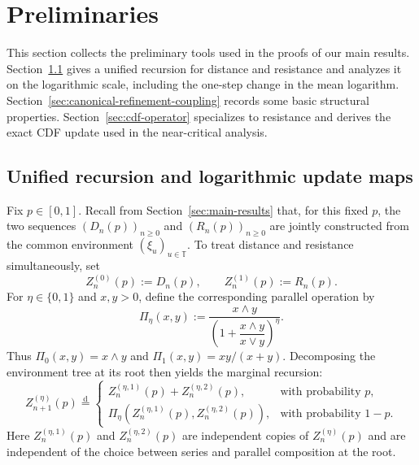 \documentclass[12pt]{amsart}
\numberwithin{equation}{section}
\theoremstyle{plain}
\theoremstyle{definition}
\begin{document}
\section{Preliminaries}
\label{sec:preliminaries}

This section collects the preliminary tools used in the proofs of our main
results.  Section~\ref{sec:gate-properties} gives a unified recursion for
distance and resistance and analyzes it on the logarithmic scale, including
the one-step change in the mean logarithm.
Section~\ref{sec:canonical-refinement-coupling} records some basic structural
properties.
Section~\ref{sec:cdf-operator} specializes to resistance and derives the exact
CDF update used in the near-critical analysis.

\subsection{Unified recursion and logarithmic update maps}
\label{sec:gate-properties}

Fix $p\in[0,1]$.
Recall from Section~\ref{sec:main-results} that, for this fixed $p$, the
two sequences $(D_n(p))_{n\ge0}$ and $(R_n(p))_{n\ge0}$ are jointly
constructed from the common environment $(\xi_u)_{u\in\mathbb T}$.
To treat distance and resistance simultaneously, set
\[
 Z_n^{(0)}(p):=D_n(p),
 \qquad
 Z_n^{(1)}(p):=R_n(p).
\]
For $\eta\in\{0,1\}$ and $x,y>0$, define the corresponding
parallel operation by
\begin{equation*}
\Pi_\eta(x,y)
 :=
 \frac{x\wedge y}
 {\left(1+\dfrac{x\wedge y}{x\vee y}\right)^\eta}.
\end{equation*}
Thus $\Pi_0(x,y)=x\wedge y$ and
$\Pi_1(x,y)=xy/(x+y)$.
Decomposing the environment tree at its root then yields the marginal
recursion:
\begin{equation}
 Z_{n+1}^{(\eta)}(p)
 \overset{\mathrm d}{=}
 \begin{cases}
 Z_n^{(\eta,1)}(p)+Z_n^{(\eta,2)}(p),&\text{with probability }p,\\[2mm]
 \Pi_\eta\!\left(Z_n^{(\eta,1)}(p),Z_n^{(\eta,2)}(p)\right),
     &\text{with probability }1-p.
 \end{cases}
 \label{eq:unified-rde}
\end{equation}
Here $Z_n^{(\eta,1)}(p)$ and $Z_n^{(\eta,2)}(p)$ are independent
copies of $Z_n^{(\eta)}(p)$ and are independent of the choice between
series and parallel composition at the root.
\end{document}
